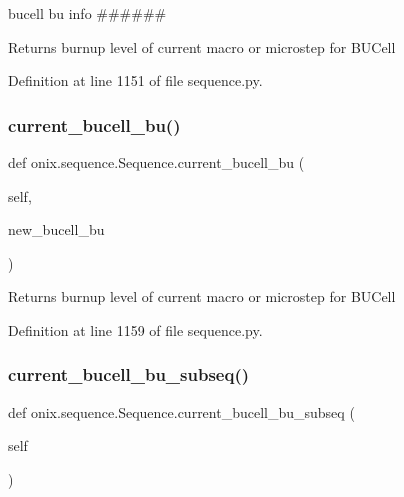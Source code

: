 bucell bu info \#\#\#\#\#\# 

\begin{DoxyVerb}Returns burnup level of current macro or microstep
for BUCell\end{DoxyVerb}
 

Definition at line 1151 of file sequence.\+py.

\mbox{\label{classonix_1_1sequence_1_1Sequence_ad97b33452a77fe96494fb01b210a9fca}} 
\subsubsection{\texorpdfstring{current\+\_\+bucell\+\_\+bu()}{current\_bucell\_bu()}\hspace{0.1cm}{\footnotesize\ttfamily [2/2]}}
{\footnotesize\ttfamily def onix.\+sequence.\+Sequence.\+current\+\_\+bucell\+\_\+bu (\begin{DoxyParamCaption}\item[{}]{self,  }\item[{}]{new\+\_\+bucell\+\_\+bu }\end{DoxyParamCaption})}

\begin{DoxyVerb}Returns burnup level of current macro or microstep
for BUCell\end{DoxyVerb}
 

Definition at line 1159 of file sequence.\+py.

\mbox{\label{classonix_1_1sequence_1_1Sequence_afb32f70bb90d9039d9c6db255d6cb758}} 
\subsubsection{\texorpdfstring{current\+\_\+bucell\+\_\+bu\+\_\+subseq()}{current\_bucell\_bu\_subseq()}}
{\footnotesize\ttfamily def onix.\+sequence.\+Sequence.\+current\+\_\+bucell\+\_\+bu\+\_\+subseq (\begin{DoxyParamCaption}\item[{}]{self }\end{DoxyParamCaption})}


